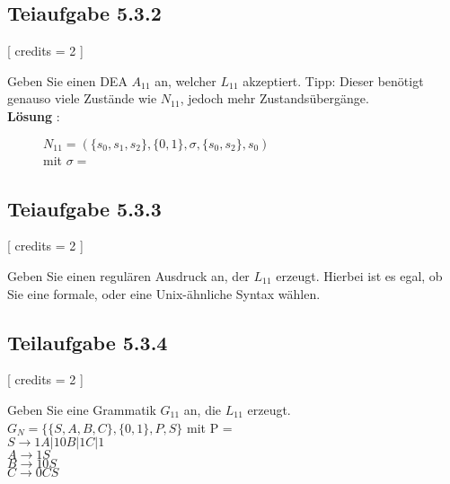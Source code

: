 \documentclass[12pt]{article}
\begin{document}
  
  
  
 \subsection*{Teiaufgabe 5.3.2} [
 credits = 2 
 ] 
  
 Geben Sie einen DEA $A_{11}$ an, welcher $L_{11}$ akzeptiert. Tipp: Dieser benötigt genauso viele Zustände wie $N_{11}$, jedoch mehr Zustandsübergänge. \\
 \textbf{Lösung} :   
 \begin{figure}[h] 
   $N_{11} = (\{s_0,s_1,s_2\},\{0,1\},\sigma,\{s_0,s_2\},s_0)$ \\ mit $\sigma =$ \\

 \centering 
  
 \end{figure} 
  
  
  
  
 \subsection*{Teiaufgabe 5.3.3} [
 credits = 2 
 ] 
  
 Geben Sie einen regulären Ausdruck an, der $L_{11}$ erzeugt. Hierbei ist es egal, ob Sie eine formale, oder eine Unix-ähnliche Syntax wählen.  
  
  
  
 \subsection*{Teilaufgabe 5.3.4} [
 credits = 2 
 ] 
  
 Geben Sie eine Grammatik $G_{11}$ an, die $L_{11}$ erzeugt.  \\
  $G_N = \{\{S,A,B,C\},\{0,1\},P,S\}$ mit P =\\
 $S \rightarrow 1A|10B|1C|1$\\
 $A \rightarrow 1S$\\
 $B \rightarrow 10S$\\
 $C \rightarrow 0CS$
 
\end{document}
